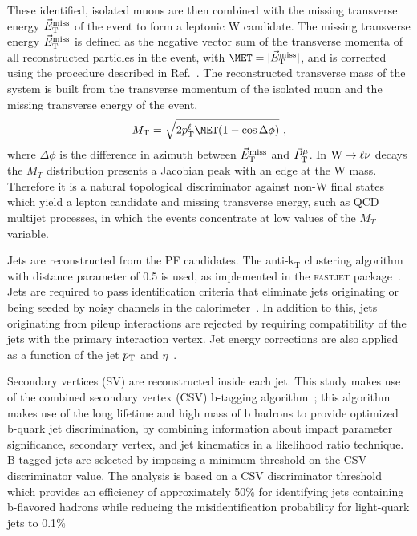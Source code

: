 These identified, isolated muons are then combined with the missing transverse 
energy $\vec{E}_\mathrm{T}^{\mathrm{miss}}$ of the event to form a leptonic W candidate. 
The missing transverse energy $\vec{E}_\mathrm{T}^{\mathrm{miss}}$ is defined as
the negative vector sum of the
transverse momenta of all reconstructed particles in the event, with $\MET = |\vecEtm|$,
and is corrected using the procedure 
described in Ref.~\cite{WZCMS:2010}.
The reconstructed transverse mass of the system is built from the transverse momentum of the isolated muon 
and the missing transverse energy of the event, 
\begin{equation*} 
M_\mathrm{T} = \sqrt{2 \pt^{\ell} \MET (1-\cos \Delta \phi)}\ ,
\nonumber
\end{equation*}
where
$\Delta \phi$
is the difference in azimuth between $\vec{E}_\mathrm{T}^{\mathrm{miss}}$ and $\vec{P}_\mathrm{T}^{\mu}$. In $\mathrm{W}\rightarrow \ell\nu$ decays the $M_T$ distribution presents a Jacobian peak 
with an edge at the W mass. Therefore it is a natural topological discriminator against non-W final states which yield a lepton candidate and
missing transverse energy, such as QCD multijet processes, 
in which the events concentrate at low values of the $M_T$ variable. 

Jets are reconstructed from the PF candidates.
The anti-$\mathrm{k_T}$
clustering algorithm~\cite{Cacciari:2008gp} with distance parameter of 0.5
is used, as implemented in the \textsc{fastjet}
package~\cite{fastjet1,fastjet2}. 
Jets are required to pass identification
criteria that eliminate jets originating or being seeded by
noisy channels in the calorimeter~\cite{Chatrchyan:2009hy}.
In addition to this, jets originating from pileup interactions are
rejected by requiring compatibility of the jets 
with the primary interaction vertex. 
Jet energy corrections are also applied as a function of the jet
$p_\mathrm{T}$ and $\eta$~\cite{cmsJEC}.

Secondary vertices (SV) are reconstructed inside each jet.
This study makes use of the combined secondary vertex (CSV) b-tagging algorithm~\cite{refCSV};
this algorithm makes use of the
long lifetime and high mass of b hadrons
to provide optimized 
b-quark jet discrimination,
by combining information 
about impact parameter significance, secondary vertex, and 
jet kinematics in a likelihood ratio technique. B-tagged jets are selected by imposing a 
minimum threshold on the CSV discriminator value.
The analysis is based on a CSV
discriminator threshold
which provides an efficiency of approximately 50$\%$  for identifying
jets containing b-flavored hadrons while reducing the misidentification probability for light-quark jets to 0.1$\%$~\cite{BTAGNOTE}


